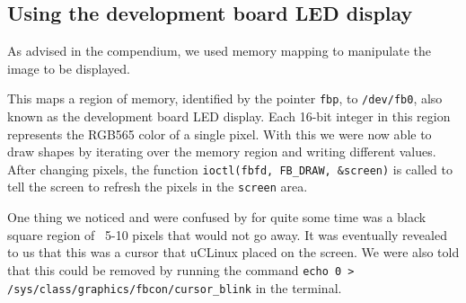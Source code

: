 \subsection{Using the development board LED display}
As advised in the compendium, we used memory mapping to manipulate the image to be displayed.



This maps a region of memory, identified by the pointer \texttt{fbp}, to \texttt{/dev/fb0}, also known as the development board LED display.
Each 16-bit integer in this region represents the RGB565 color of a single pixel.
With this we were now able to draw shapes by iterating over the memory region and writing different values.
After changing pixels, the function \texttt{ioctl(fbfd, FB\_DRAW, \&screen)} is called to tell the screen to refresh the pixels in the \texttt{screen} area.

One thing we noticed and were confused by for quite some time was a black square region of ~5-10 pixels that would not go away.
It was eventually revealed to us that this was a cursor that uCLinux placed on the screen.
We were also told that this could be removed by running the command \texttt{echo 0 > /sys/class/graphics/fbcon/cursor\_blink} in the terminal.
